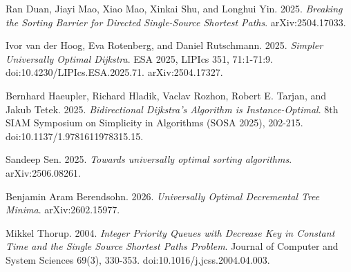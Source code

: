 \begin{enumerate}[label={[\arabic*]},leftmargin=3em,labelsep=.75em,itemsep=.5em,topsep=.3em,parsep=0pt]
\item Ran Duan, Jiayi Mao, Xiao Mao, Xinkai Shu, and Longhui Yin. 2025. \emph{Breaking the Sorting Barrier for Directed Single-Source Shortest Paths}. arXiv:2504.17033.
\item Ivor van der Hoog, Eva Rotenberg, and Daniel Rutschmann. 2025. \emph{Simpler Universally Optimal Dijkstra}. ESA 2025, LIPIcs 351, 71:1-71:9. doi:10.4230/LIPIcs.ESA.2025.71. arXiv:2504.17327.
\item Bernhard Haeupler, Richard Hladik, Vaclav Rozhon, Robert E. Tarjan, and Jakub Tetek. 2025. \emph{Bidirectional Dijkstra's Algorithm is Instance-Optimal}. 8th SIAM Symposium on Simplicity in Algorithms (SOSA 2025), 202-215. doi:10.1137/1.9781611978315.15.
\item Sandeep Sen. 2025. \emph{Towards universally optimal sorting algorithms}. arXiv:2506.08261.
\item Benjamin Aram Berendsohn. 2026. \emph{Universally Optimal Decremental Tree Minima}. arXiv:2602.15977.
\item Mikkel Thorup. 2004. \emph{Integer Priority Queues with Decrease Key in Constant Time and the Single Source Shortest Paths Problem}. Journal of Computer and System Sciences 69(3), 330-353. doi:10.1016/j.jcss.2004.04.003.
\end{enumerate}
